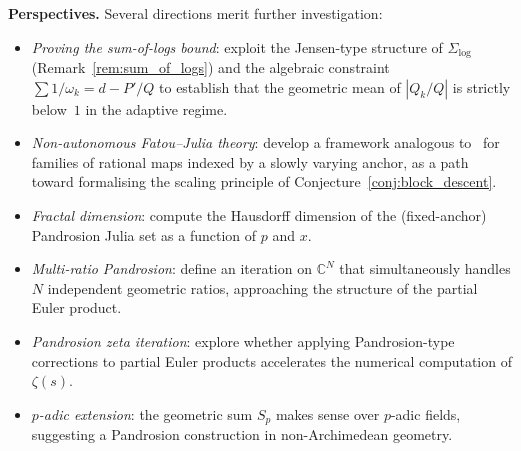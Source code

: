 \documentclass[11pt,a4paper]{article}
\theoremstyle{definition}
\newcommand{\CC}{\mathbb{C}}
\begin{document}
\textbf{Perspectives.}
Several directions merit further investigation:
\begin{itemize}
  \item \emph{Proving the sum-of-logs bound}: exploit the Jensen-type structure of $\Sigma_{\log}$ (Remark~\ref{rem:sum_of_logs}) and the algebraic constraint $\sum 1/\omega_k = d - P'/Q$ to establish that the geometric mean of $|Q_k/Q|$ is strictly below~$1$ in the adaptive regime.
  \item \emph{Non-autonomous Fatou--Julia theory}: develop a framework analogous to~\cite{milnor} for families of rational maps indexed by a slowly varying anchor, as a path toward formalising the scaling principle of Conjecture~\ref{conj:block_descent}.
  \item \emph{Fractal dimension}: compute the Hausdorff dimension of the (fixed-anchor) Pandrosion Julia set as a function of $p$ and $x$.
  \item \emph{Multi-ratio Pandrosion}: define an iteration on $\CC^N$ that simultaneously handles $N$ independent geometric ratios, approaching the structure of the partial Euler product.
  \item \emph{Pandrosion zeta iteration}: explore whether applying Pandrosion-type corrections to partial Euler products accelerates the numerical computation of $\zeta(s)$.
  \item \emph{$p$-adic extension}: the geometric sum $S_p$ makes sense over $p$-adic fields, suggesting a Pandrosion construction in non-Archimedean geometry.
\end{itemize}
\end{document}

